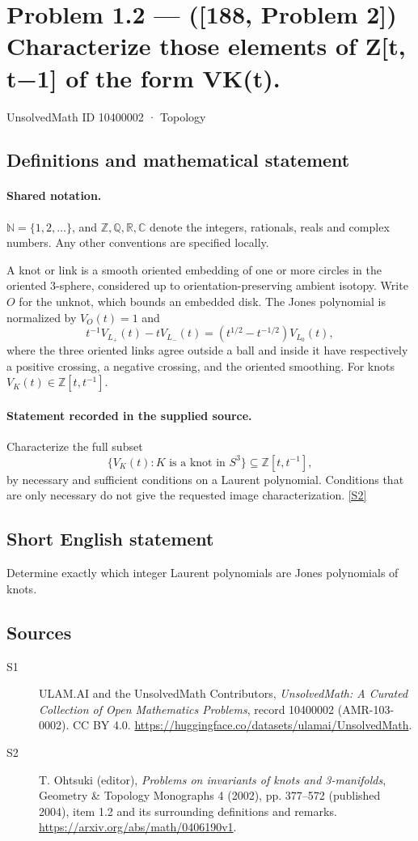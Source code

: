 \documentclass[11pt]{article}
\newcommand{\sref}[2]{\hyperlink{source:#1:#2}{[S#2]}}
\begin{document}
\setcounter{section}{10400001}
\section{Problem 1.2 — ([188, Problem 2]) Characterize those elements of Z[t, t−1] of the form VK(t).}\label{10400002}
{\small\sffamily UnsolvedMath ID 10400002 · Topology}
\subsection{Definitions and mathematical statement}

\paragraph{Shared notation.}$\mathbb N=\{1,2,\ldots\}$, and $\mathbb Z,\mathbb Q,\mathbb R,\mathbb C$ denote the integers, rationals, reals and complex numbers. Any other conventions are specified locally.


A knot or link is a smooth oriented embedding of one or more circles in the oriented $3$-sphere, considered up to orientation-preserving ambient isotopy. Write $O$ for the unknot, which bounds an embedded disk. The Jones polynomial is normalized by $V_O(t)=1$ and
\[t^{-1}V_{L_+}(t)-tV_{L_-}(t)=(t^{1/2}-t^{-1/2})V_{L_0}(t),\]
where the three oriented links agree outside a ball and inside it have respectively a positive crossing, a negative crossing, and the oriented smoothing. For knots $V_K(t)\in\mathbb Z[t,t^{-1}]$.
\paragraph{Statement recorded in the supplied source.}
Characterize the full subset
\[\{V_K(t):K\text{ is a knot in }S^3\}\subseteq\mathbb Z[t,t^{-1}],\]
by necessary and sufficient conditions on a Laurent polynomial. Conditions that are only necessary do not give the requested image characterization. \sref{10400002}{2}
\subsection{Short English statement}
Determine exactly which integer Laurent polynomials are Jones polynomials of knots.
\subsection{Sources}
\begin{description}
\item[\hypertarget{source:10400002:1}{S1}] ULAM.AI and the UnsolvedMath Contributors, \emph{UnsolvedMath: A Curated Collection of Open Mathematics Problems}, record 10400002 (AMR-103-0002). CC BY 4.0. \url{https://huggingface.co/datasets/ulamai/UnsolvedMath}.
\item[\hypertarget{source:10400002:2}{S2}] T. Ohtsuki (editor), \emph{Problems on invariants of knots and 3-manifolds}, Geometry \& Topology Monographs 4 (2002), pp. 377--572 (published 2004), item 1.2 and its surrounding definitions and remarks. \url{https://arxiv.org/abs/math/0406190v1}.
\end{description}
\label{end:10400002}
\end{document}
